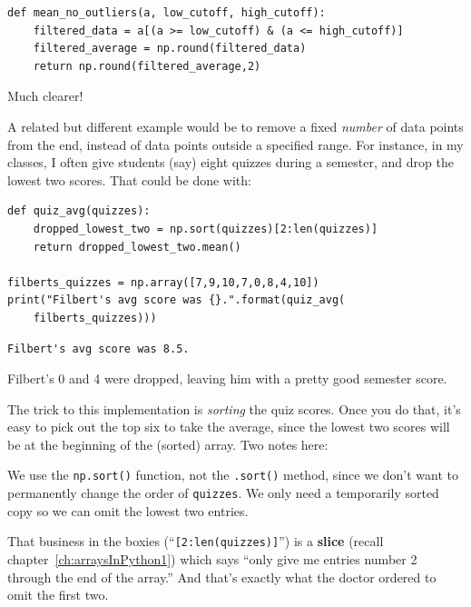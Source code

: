 \begin{Verbatim}[fontsize=\footnotesize,samepage=true,frame=single,framesep=3mm]
def mean_no_outliers(a, low_cutoff, high_cutoff):
    filtered_data = a[(a >= low_cutoff) & (a <= high_cutoff)]
    filtered_average = np.round(filtered_data)
    return np.round(filtered_average,2)
\end{Verbatim}

Much clearer!

\medskip

A related but different example would be to remove a fixed \textit{number} of
data points from the end, instead of data points outside a specified range. For
instance, in my classes, I often give students (say) eight quizzes during a
semester, and drop the lowest two scores. That could be done with:


\begin{Verbatim}[fontsize=\footnotesize,samepage=true,frame=single,framesep=3mm]
def quiz_avg(quizzes):
    dropped_lowest_two = np.sort(quizzes)[2:len(quizzes)]
    return dropped_lowest_two.mean()

filberts_quizzes = np.array([7,9,10,7,0,8,4,10])
print("Filbert's avg score was {}.".format(quiz_avg(
    filberts_quizzes)))
\end{Verbatim}
\vspace{-.2in}

\begin{Verbatim}[fontsize=\small,samepage=true,frame=leftline,framesep=5mm,framerule=1mm]
Filbert's avg score was 8.5.
\end{Verbatim}

Filbert's 0 and 4 were dropped, leaving him with a pretty good semester score.

The trick to this implementation is \textit{sorting} the quiz scores. Once you
do that, it's easy to pick out the top six to take the average, since the
lowest two scores will be at the beginning of the (sorted) array. Two notes
here:



\begin{compactitem}
\item We use the \texttt{np.sort()} function, not the \texttt{.sort()} method,
since we don't want to permanently change the order of \texttt{quizzes}. We
only need a temporarily sorted copy so we can omit the lowest two entries.
\item That business in the boxies (``\texttt{[2:len(quizzes)]}'') is a
\textbf{slice} (recall chapter~\ref{ch:arraysInPython1}) which says ``only give
me entries number 2 through the end of the array.'' And that's exactly what the
doctor ordered to omit the first two.
\end{compactitem}

